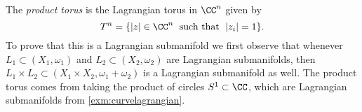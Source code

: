 

    The \emph{product torus} is the Lagrangian torus in $\CC^n$ given by 
    \[T^n=\{|z|\in \CC^n\;\text{ such that }\; |z_i|=1\}.\]
    To prove that this is a Lagrangian submanifold we first observe that whenever $L_1\subset (X_1, \omega_1)$ and $L_2\subset (X_2, \omega_2)$ are Lagrangian submanifolds, then $L_1\times L_2\subset (X_1\times X_2, \omega_1+\omega_2)$ is a Lagrangian submanifold as well. 
    The product torus comes from taking the product of circles $S^1\subset \CC$, which are Lagrangian submanifolds from \cref{exm:curvelagrangian}.


